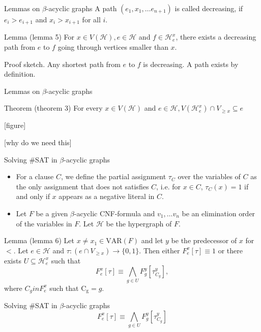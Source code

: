 \begin{frame}[t]{Lemmas on $\beta$-acyclic graphs}
	A path $(e_1, x_1, \dots e_{n+1})$ is called decreasing, if $e_i > e_{i+1}$ and $x_i > x_{i+1}$ for all $i$.
	\begin{block}{Lemma (lemma 5)}
		For $x \in V(\mathcal{H}), e \in \mathcal{H}$ and $f \in \mathcal{H}^x_e$, there exists a decreasing path from $e$ to $f$ going through vertices smaller than $x$.
	\end{block}
	Proof sketch. Any shortest path from $e$ to $f$ is decreasing. A path exists by definition.

\end{frame}

\begin{frame}[t]{Lemmas on $\beta$-acyclic graphs}
	\begin{block}{Theorem (theorem 3)}
		For every $x \in V(\mathcal{H})$ and $e \in \mathcal{H}, V(\mathcal{H}^x_e) \cap V_{\geq x} \subseteq e$
	\end{block}

	[figure]

	[why do we need this]
\end{frame}


\begin{frame}[t]{Solving \#SAT in $\beta$-acyclic graphs}
	\begin{itemize}
		\item For a clause $C$, we define the partial assignment $\tau_C$ over the variables of $C$ as the only assignment that does not satisfies $C$, i.e. for $x \in C$, $\tau_C(x) = 1$ if and only if $x$ appears as a negative literal in $C$.

		\item Let $F$ be a given $\beta$-acyclic CNF-formula and $v_1, \dots v_n$ be an elimination order of the variables in $F$. Let $\mathcal{H}$ be the hypergraph of $F$.
	\end{itemize}
	\begin{block}{Lemma (lemma 6)}
		Let $x \neq x_1 \in \mathrm{VAR}(F)$ and let $y$ be the predecessor of $x$ for $<$.  Let $e \in \mathcal{H}$ and $\tau : (e \cap V_{\geq x}) \rightarrow \{0, 1\}$. Then either $F^x_e[\tau] \equiv 1$ or there exists $U \subseteq \mathcal{H}^x_e$ such that 
		$$ F^x_e[\tau] \equiv \bigwedge\limits_{g \in U} F^y_g[\tau^y_{C_g}],$$
		where $C_g in F^x_e$ such that $\mathrm{C_g} = g$.
	\end{block}
\end{frame}

\begin{frame}[t]{Solving \#SAT in $\beta$-acyclic graphs}
		$$ F^x_e[\tau] \equiv \bigwedge\limits_{g \in U} F^y_g[\tau^y_{C_g}]$$
\end{frame}

